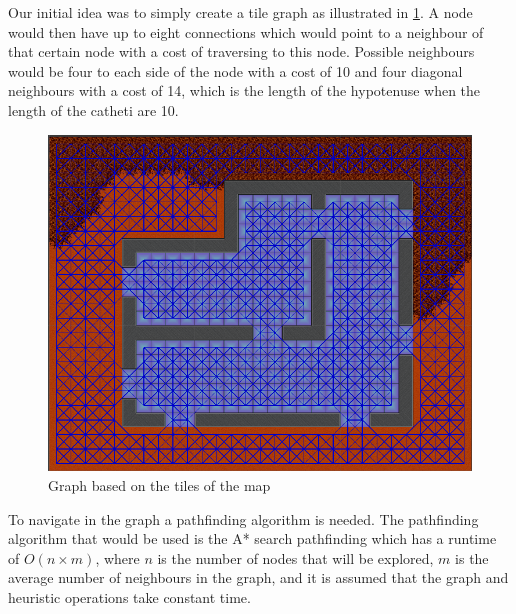 Our initial idea was to simply create a tile graph\cite{AIG:Millington} as illustrated in \ref{gridGraph}.
A node would then have up to eight connections which would point to a neighbour of that certain node with a cost of traversing to this node.
Possible neighbours would be four to each side of the node with a cost of 10 and four diagonal neighbours with a cost of 14, which is the length of the hypotenuse when the length of the catheti are 10.
\begin{figure}[H]
	\includegraphics[width=\textwidth]{figures/astar/gridGraph}
	\caption{Graph based on the tiles of the map}
	\label{gridGraph}
\end{figure}

To navigate in the graph a pathfinding algorithm is needed. 
The pathfinding algorithm that would be used is the A* search pathfinding which has a runtime of $O(n \times m)$, where $n$ is the number of nodes that will be explored, $m$ is the average number of neighbours in the graph, and it is assumed that the graph and heuristic operations take constant time\cite{AIG:Millington}.

